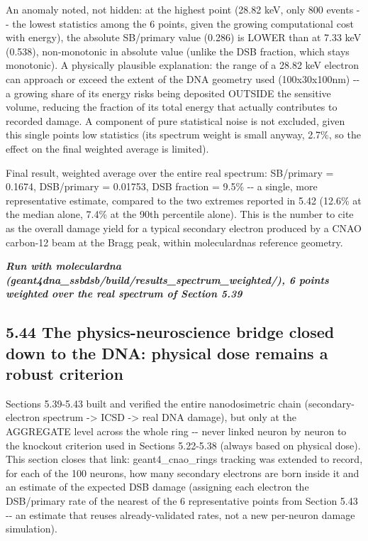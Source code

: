\documentclass[
  english,
]{article}
\begin{document}
An anomaly noted, not hidden: at the highest point (28.82 keV, only 800 events -\/- the lowest statistics among the 6 points, given the growing computational cost with energy), the absolute SB/primary value (0.286) is LOWER than at 7.33 keV (0.538), non-monotonic in absolute value (unlike the DSB fraction, which stays monotonic). A physically plausible explanation: the range of a 28.82 keV electron can approach or exceed the extent of the DNA geometry used (100x30x100nm) -\/- a growing share of its energy risks being deposited OUTSIDE the sensitive volume, reducing the fraction of its total energy that actually contributes to recorded damage. A component of pure statistical noise is not excluded, given this single point\textquotesingle s low statistics (its spectrum weight is small anyway, 2.7\%, so the effect on the final weighted average is limited).

Final result, weighted average over the entire real spectrum: SB/primary = 0.1674, DSB/primary = 0.01753, DSB fraction = 9.5\% -\/- a single, more representative estimate, compared to the two extremes reported in 5.42 (12.6\% at the median alone, 7.4\% at the 90th percentile alone). This is the number to cite as the overall damage yield for a typical secondary electron produced by a CNAO carbon-12 beam at the Bragg peak, within moleculardna\textquotesingle s reference geometry.

\emph{\textbf{Run with moleculardna (geant4dna\_\allowbreak{}ssbdsb/build/results\_\allowbreak{}spectrum\_\allowbreak{}weighted/), 6 points weighted over the real spectrum of Section 5.39}}

\subsection{5.44 The physics-neuroscience bridge closed down to the DNA: physical dose remains a robust criterion}\label{the-physics-neuroscience-bridge-closed-down-to-the-dna-physical-dose-remains-a-robust-criterion}

Sections 5.39-5.43 built and verified the entire nanodosimetric chain (secondary-electron spectrum -\textgreater{} ICSD -\textgreater{} real DNA damage), but only at the AGGREGATE level across the whole ring -\/- never linked neuron by neuron to the knockout criterion used in Sections 5.22-5.38 (always based on physical dose). This section closes that link: geant4\_\allowbreak{}cnao\_\allowbreak{}ring\textquotesingle s tracking was extended to record, for each of the 100 neurons, how many secondary electrons are born inside it and an estimate of the expected DSB damage (assigning each electron the DSB/primary rate of the nearest of the 6 representative points from Section 5.43 -\/- an estimate that reuses already-validated rates, not a new per-neuron damage simulation).
\end{document}
